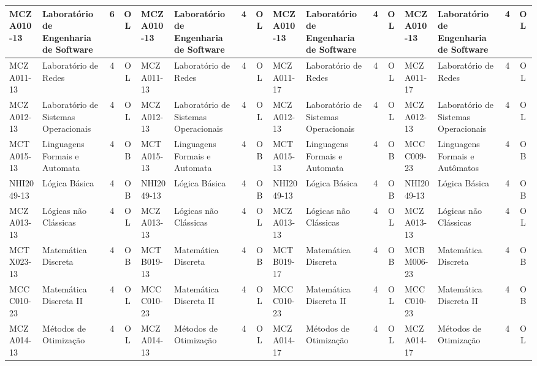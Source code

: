 \documentclass[a4paper]{article}
\begin{document}
\begin{landscape}
{\begin{longtable}{|l|p{.15\textheight}|c|c||l|p{.15\textheight}|c|c||l|p{.15\textheight}|c|c||l|p{.15\textheight}|c|c|}
    MCZA010-13 & Laboratório de Engenharia de Software & 6 & OL &
    MCZA010-13 & Laboratório de Engenharia de Software & 4 & OL &
    MCZA010-13 & Laboratório de Engenharia de Software & 4 & OL &
    MCZA010-13 & Laboratório de Engenharia de Software & 4 & OL \\ \hline

    MCZA011-13 & Laboratório de Redes & 4 & OL &
    MCZA011-13 & Laboratório de Redes & 4 & OL &
    MCZA011-17 & Laboratório de Redes & 4 & OL &
    MCZA011-17 & Laboratório de Redes & 4 & OL \\ \hline

    MCZA012-13 & Laboratório de Sistemas Operacionais & 4 & OL &
    MCZA012-13 & Laboratório de Sistemas Operacionais & 4 & OL &
    MCZA012-13 & Laboratório de Sistemas Operacionais & 4 & OL & 
    MCZA012-13 & Laboratório de Sistemas Operacionais & 4 & OL \\ \hline

    MCTA015-13 & Linguagens Formais e Automata  & 4 & OB &
    MCTA015-13 & Linguagens Formais e Automata  & 4 & OB &
    MCTA015-13 & Linguagens Formais e Automata  & 4 & OB &
    MCCC009-23 & Linguagens Formais e Autômatos & 4 & OB\\ \hline

    NHI2049-13 & Lógica Básica & 4 & OB &
    NHI2049-13 & Lógica Básica & 4 & OB &
    NHI2049-13 & Lógica Básica & 4 & OB &
    NHI2049-13 & Lógica Básica & 4 & OB \\ \hline

    MCZA013-13 & Lógicas não Clássicas & 4 & OL &
    MCZA013-13 & Lógicas não Clássicas & 4 & OL &
    MCZA013-13 & Lógicas não Clássicas & 4 & OL &
    MCZA013-13 & Lógicas não Clássicas & 4 & OL \\ \hline

    MCTX023-13 & Matemática Discreta & 4 & OB &
    MCTB019-13 & Matemática Discreta & 4 & OB &
    MCTB019-17 & Matemática Discreta & 4 & OB &
    MCBM006-23 & Matemática Discreta & 4 & OB\\ \hline

    MCCC010-23 & Matemática Discreta II & 4 & OL &
    MCCC010-23 & Matemática Discreta II & 4 & OL &
    MCCC010-23 & Matemática Discreta II & 4 & OL &
    MCCC010-23 & Matemática Discreta II & 4 & OB\\ \hline

    MCZA014-13 & Métodos de Otimização & 4 & OL &
    MCZA014-13 & Métodos de Otimização & 4 & OL &
    MCZA014-17 & Métodos de Otimização & 4 & OL &
    MCZA014-17 & Métodos de Otimização & 4 & OL \\ \hline


\end{longtable}}
\end{landscape}
\end{document}
